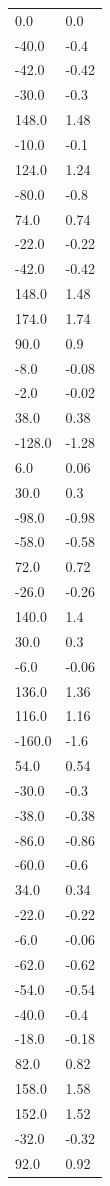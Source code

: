 \begin{longtable}{ll}
0.0 & 0.0 \\
-40.0 & -0.4 \\
-42.0 & -0.42 \\
-30.0 & -0.3 \\
148.0 & 1.48 \\
-10.0 & -0.1 \\
124.0 & 1.24 \\
-80.0 & -0.8 \\
74.0 & 0.74 \\
-22.0 & -0.22 \\
-42.0 & -0.42 \\
148.0 & 1.48 \\
174.0 & 1.74 \\
90.0 & 0.9 \\
-8.0 & -0.08 \\
-2.0 & -0.02 \\
38.0 & 0.38 \\
-128.0 & -1.28 \\
6.0 & 0.06 \\
30.0 & 0.3 \\
-98.0 & -0.98 \\
-58.0 & -0.58 \\
72.0 & 0.72 \\
-26.0 & -0.26 \\
140.0 & 1.4 \\
30.0 & 0.3 \\
-6.0 & -0.06 \\
136.0 & 1.36 \\
116.0 & 1.16 \\
-160.0 & -1.6 \\
54.0 & 0.54 \\
-30.0 & -0.3 \\
-38.0 & -0.38 \\
-86.0 & -0.86 \\
-60.0 & -0.6 \\
34.0 & 0.34 \\
-22.0 & -0.22 \\
-6.0 & -0.06 \\
-62.0 & -0.62 \\
-54.0 & -0.54 \\
-40.0 & -0.4 \\
-18.0 & -0.18 \\
82.0 & 0.82 \\
158.0 & 1.58 \\
152.0 & 1.52 \\
-32.0 & -0.32 \\
92.0 & 0.92 \\

\end{longtable}
